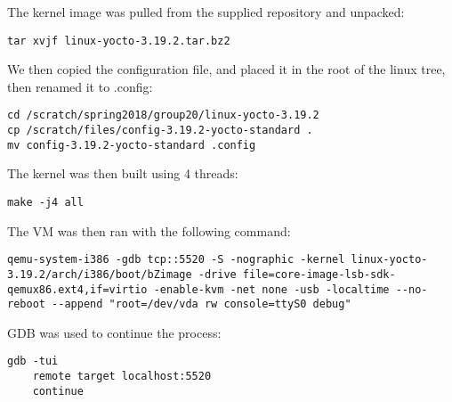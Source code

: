 \documentclass[onecolumn, draftclsnofoot,10pt, compsoc]{IEEEtran}
\begin{document}
The kernel image was pulled from the supplied repository and unpacked:
\begin{lstlisting}
tar xvjf linux-yocto-3.19.2.tar.bz2
\end{lstlisting}

We then copied the configuration file, and placed it in the root of the linux tree, then renamed it to .config:
\begin{lstlisting}
cd /scratch/spring2018/group20/linux-yocto-3.19.2
cp /scratch/files/config-3.19.2-yocto-standard .
mv config-3.19.2-yocto-standard .config
\end{lstlisting}

The kernel was then built using 4 threads:
\begin{lstlisting}
make -j4 all
\end{lstlisting}

The VM was then ran with the following command:
\begin{lstlisting}
qemu-system-i386 -gdb tcp::5520 -S -nographic -kernel linux-yocto-3.19.2/arch/i386/boot/bZimage -drive file=core-image-lsb-sdk-qemux86.ext4,if=virtio -enable-kvm -net none -usb -localtime --no-reboot --append "root=/dev/vda rw console=ttyS0 debug"
\end{lstlisting}

GDB was used to continue the process:
\begin{lstlisting}
gdb -tui
    remote target localhost:5520
    continue
\end{lstlisting}
\end{document}
